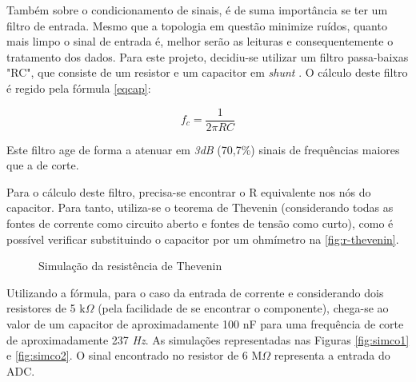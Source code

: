 Também sobre o condicionamento de sinais, é de suma importância se ter um filtro de entrada. Mesmo que a topologia em questão minimize ruídos, quanto mais limpo o sinal de entrada é, melhor serão as leituras e consequentemente o tratamento dos dados. Para este projeto, decidiu-se utilizar um filtro passa-baixas "RC", que consiste de um resistor e um capacitor em \textit{shunt} \cite{filtros}. O cálculo deste filtro é regido pela fórmula \autoref{eqcap}:

\begin{equation}
    \label{eqcap}
    f_{c} = \frac{1}{2\pi RC}
\end{equation}

Este filtro age de forma a atenuar em \textit{3dB} (70,7\%) sinais de frequências maiores que a de corte.

Para o cálculo deste filtro, precisa-se encontrar o R equivalente nos nós do capacitor. Para tanto, utiliza-se o teorema de Thevenin (considerando todas as fontes de corrente como circuito aberto e fontes de tensão como curto), como é possível verificar substituindo o capacitor por um ohmímetro na \autoref{fig:r-thevenin}.

\begin{figure}[htb!]
    \caption{Simulação da resistência de Thevenin}
    \label{fig:r-thevenin}
    \fonte{}
\end{figure}

Utilizando a fórmula, para o caso da entrada de corrente e considerando dois resistores de 5 k$\Omega$ (pela facilidade de se encontrar o componente), chega-se ao valor de um capacitor de aproximadamente 100 nF para uma frequência de corte de aproximadamente 237 \textit{Hz}. As simulações representadas nas Figuras \ref{fig:simco1} e \ref{fig:simco2}. O sinal encontrado no resistor de 6 M$\Omega$ representa a entrada do \gls{ADC}.

